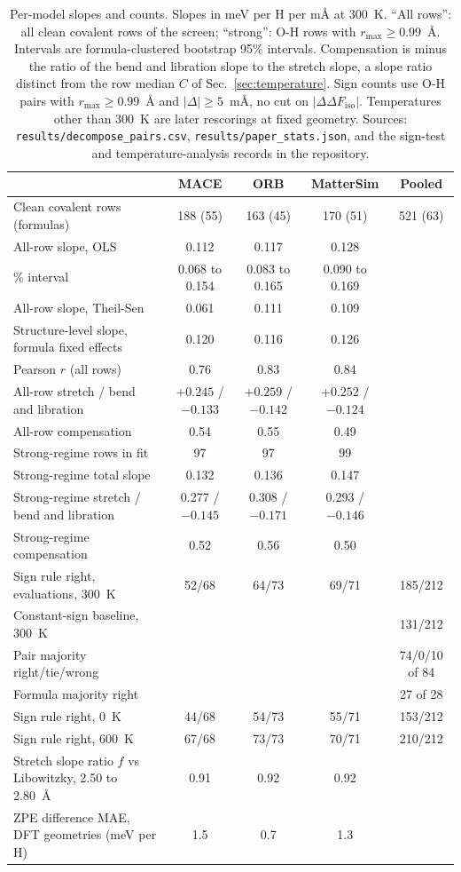 \documentclass[aps,prmaterials,reprint,superscriptaddress,nofootinbib]{revtex4-2}
\newcommand{\ddF}{\Delta\Delta F_{\mathrm{iso}}}
\begin{document}
\begin{table}[t]
\caption{Per-model slopes and counts. Slopes in meV per H per m\AA{} at 300~K. ``All rows'': all clean covalent rows of the screen; ``strong'': O-H rows with $r_{\max}\geq0.99$~\AA. Intervals are formula-clustered bootstrap 95\% intervals. Compensation is minus the ratio of the bend and libration slope to the stretch slope, a slope ratio distinct from the row median $C$ of Sec.~\ref{sec:temperature}. Sign counts use O-H pairs with $r_{\max}\geq0.99$~\AA{} and $|\Delta|\geq5$~m\AA, no cut on $|\ddF|$. Temperatures other than 300~K are later rescorings at fixed geometry. Sources: \texttt{results/decompose\_pairs.csv}, \texttt{results/paper\_stats.json}, and the sign-test and temperature-analysis records in the repository.}
\label{tab:models}
\begin{ruledtabular}
\begin{tabular}{lcccc}
 & MACE & ORB & MatterSim & Pooled \\
\hline
Clean covalent rows (formulas) & 188 (55) & 163 (45) & 170 (51) & 521 (63) \\
All-row slope, OLS & 0.112 & 0.117 & 0.128 & \\
\quad 95\% interval & 0.068 to 0.154 & 0.083 to 0.165 & 0.090 to 0.169 & \\
All-row slope, Theil-Sen & 0.061 & 0.111 & 0.109 & \\
Structure-level slope, formula fixed effects & 0.120 & 0.116 & 0.126 & \\
Pearson $r$ (all rows) & 0.76 & 0.83 & 0.84 & \\
All-row stretch / bend and libration & $+0.245$ / $-0.133$ & $+0.259$ / $-0.142$ & $+0.252$ / $-0.124$ & \\
All-row compensation & 0.54 & 0.55 & 0.49 & \\
Strong-regime rows in fit & 97 & 97 & 99 & \\
Strong-regime total slope & 0.132 & 0.136 & 0.147 & \\
Strong-regime stretch / bend and libration & 0.277 / $-0.145$ & 0.308 / $-0.171$ & 0.293 / $-0.146$ & \\
Strong-regime compensation & 0.52 & 0.56 & 0.50 & \\
Sign rule right, evaluations, 300~K & 52/68 & 64/73 & 69/71 & 185/212 \\
Constant-sign baseline, 300~K & & & & 131/212 \\
Pair majority right/tie/wrong & & & & 74/0/10 of 84 \\
Formula majority right & & & & 27 of 28 \\
Sign rule right, 0~K & 44/68 & 54/73 & 55/71 & 153/212 \\
Sign rule right, 600~K & 67/68 & 73/73 & 70/71 & 210/212 \\
Stretch slope ratio $f$ vs Libowitzky, 2.50 to 2.80~\AA & 0.91 & 0.92 & 0.92 & \\
ZPE difference MAE, DFT geometries (meV per H) & 1.5 & 0.7 & 1.3 & \\
\end{tabular}
\end{ruledtabular}
\end{table}
\end{document}
